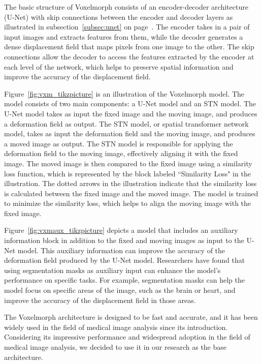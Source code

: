 \documentclass{book}
\begin{document}
	The basic structure of Voxelmorph consists of an encoder-decoder architecture (U-Net) with skip connections between the encoder and decoder layers as illustrated in subsection~\ref{subsec:unet} on page~\pageref{subsec:unet}. The encoder takes in a pair of input images and extracts features from them, while the decoder generates a dense displacement field that maps pixels from one image to the other. The skip connections allow the decoder to access the features extracted by the encoder at each level of the network, which helps to preserve spatial information and improve the accuracy of the displacement field.
	
	Figure~\ref{fig:vxm_tikzpicture} is an illustration of the Voxelmorph model. The model consists of two main components: a U-Net model and an STN model. The U-Net model takes as input the fixed image and the moving image, and produces a deformation field as output. The STN model, or spatial transformer network model, takes as input the deformation field and the moving image, and produces a moved image as output. The STN model is responsible for applying the deformation field to the moving image, effectively aligning it with the fixed image. The moved image is then compared to the fixed image using a similarity loss function, which is represented by the block labeled ``Similarity Loss" in the illustration. The dotted arrows in the illustration indicate that the similarity loss is calculated between the fixed image and the moved image. The model is trained to minimize the similarity loss, which helps to align the moving image with the fixed image.
	
	Figure~\ref{fig:vxmaux_tikzpicture} depicts a model that includes an auxiliary information block in addition to the fixed and moving images as input to the U-Net model. This auxiliary information can improve the accuracy of the deformation field produced by the U-Net model. Researchers have found that using segmentation masks as auxiliary input can enhance the model's performance on specific tasks. For example, segmentation masks can help the model focus on specific areas of the image, such as the brain or heart, and improve the accuracy of the displacement field in those areas.
	
	The Voxelmorph architecture is designed to be fast and accurate, and it has been widely used in the field of medical image analysis since its introduction. Considering its impressive performance and widespread adoption in the field of medical image analysis, we decided to use it in our research as the base architecture.
	
\end{document}
